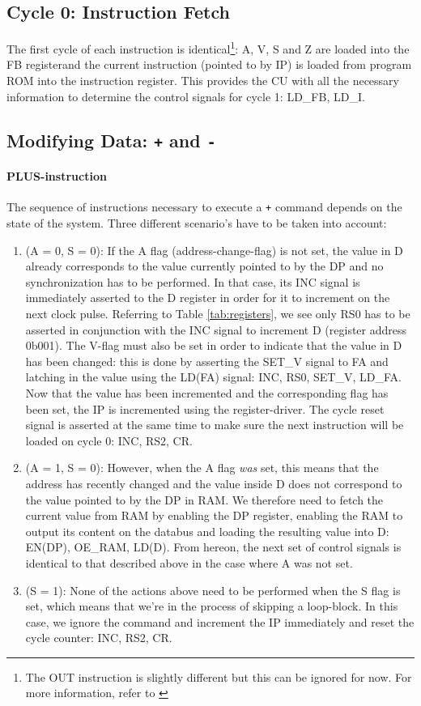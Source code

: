 \documentclass{article}
\begin{document}
\subsection{Cycle 0: Instruction Fetch}
The first cycle of each instruction is identical\footnote{The OUT instruction is slightly different but this can be ignored for now. For more information, refer to \label{sec:??}}: A, V, S and Z are loaded into the FB registerand the current instruction (pointed to by IP) is loaded from program ROM into the instruction register. This provides the CU with all the necessary information to determine the control signals for cycle 1: LD\_FB, LD\_I.

\subsection{Modifying Data: \texttt{+} and \texttt{-}} \label{sec:sequences:+-}
\paragraph{PLUS-instruction} The sequence of instructions necessary to execute a \texttt{+} command depends on the state of the system. Three different scenario's have to be taken into account:
\begin{enumerate}
\item (A = 0, S = 0): If the A flag (address-change-flag) is not set, the value in D already corresponds to the value currently pointed to by the DP and no synchronization has to be performed. In that case, its INC signal is immediately asserted to the D register in order for it to increment on the next clock pulse. Referring to Table \ref{tab:registers}, we see only RS0 has to be asserted in conjunction with the INC signal to increment D (register address 0b001). The V-flag must also be set in order to indicate that the value in D has been changed: this is done by asserting the SET\_V signal to FA and latching in the value using the LD(FA) signal: INC, RS0, SET\_V, LD\_FA. Now that the value has been incremented and the corresponding flag has been set, the IP is incremented using the register-driver. The cycle reset signal is asserted at the same time to make sure the next instruction will be loaded on cycle 0: INC, RS2, CR.
\item (A = 1, S = 0): However, when the A flag \emph{was} set, this means that the address has recently changed and the value inside D does not correspond to the value pointed to by the DP in RAM. We therefore need to fetch the current value from RAM by enabling the DP register, enabling the RAM to output its content on the databus and loading the resulting value into D: EN(DP), OE\_RAM, LD(D). From hereon, the next set of control signals is identical to that described above in the case where A was not set.
  \item (S = 1): None of the actions above need to be performed when the S flag is set, which means that we're in the process of skipping a loop-block. In this case, we ignore the command and increment the IP immediately and reset the cycle counter: INC, RS2, CR.
\end{enumerate}
\end{document}
